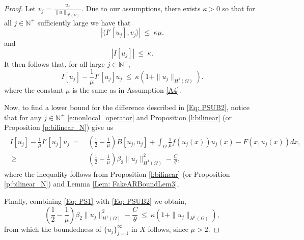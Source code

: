 \documentclass[11pt]{amsart}   	%
\theoremstyle{plain}
\numberwithin{equation}{section}
\def\be{\beta}
\def\ka{\kappa}
\def\Om{\Omega}
\def\th{\theta}
\def\N{\mathbb{N}}
\def\R{\mathbb{R}}
\def\grad{\nabla}
\begin{document}
\begin{proof}
    Let $v_j = \frac{u_j}{\| u\|_{H^1(\Omega)}}$.
    Due to our assumptions, there exists $\ka > 0$ so that for all $j \in \N^+$ sufficiently large we have that
    \begin{equation}\label{Eq: Deriv->0Eq1}
         \left| \langle I'[u_j], v_j \rangle  \right| \ \leq \ \ka\mu.
    \end{equation}
    and
    \begin{equation}\label{Eq: Deriv->0Eq2}
        |I[u_j]| \ \leq \ \ka.
    \end{equation}
    It then follows that, for all large $j \in \N^+$, 
\begin{equation}\label{Eq: PSUB2}
   I[u_j] - \frac{1}{\mu}I'[u_j]u_j \ \leq \ \ka(1 + \| u_j\|_{H^1(\Omega)}).
\end{equation}
where the constant $\mu$ is the same as in Assumption \ref{A4}.

Now, to find a lower bound for the difference described in \eqref{Eq: PSUB2}, notice that for any $j \in \N^+$ \eqref{e:nonlocal_operator} and Proposition \ref{l:bilinear} (or Proposition \ref{p:bilinear_N}) give us
    \begin{eqnarray}\label{Eq: PS1}
        \begin{aligned}
            I[u_j] - \frac{1}{\mu}I'[u_j]u_j \ = \ & \left( \frac{1}{2} - \frac{1}{\mu} \right) B[u_j,u_j] 
            + \int_{\Om}\frac{1}{\mu}f(u_j(x))u_j(x) - F(x, u_j(x))dx, \\
           \ \geq \ & \left( \frac{1}{2} - \frac{1}{\mu} \right) \beta_2 \| u_j\|^2_{H^1(\Omega)} - \frac{C}{\theta},
        \end{aligned}
    \end{eqnarray}
   where the inequality follows from Proposition \ref{l:bilinear} (or Proposition \ref{p:bilinear_N}) and Lemma \ref{Lem: FakeARBoundLem3}, 
 

Finally, combining \eqref{Eq: PS1} with \eqref{Eq: PSUB2} we obtain,
\begin{equation}
    \left(\frac{1}{2} - \frac{1}{\mu}\right)\be_2\| u_j\|^2_{H^1(\Omega)} - \frac{C}{\th} \ \leq \ \ka(1 + \| u_j\|_{H^1(\Omega)}),
\end{equation}
from which the boundedness of $\{u_j\}^{\infty}_{j = 1}$ in $X$ follows, since $\mu > 2$.
\end{proof}
\end{document}
